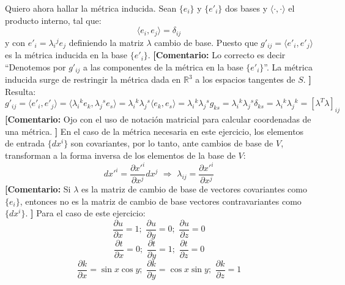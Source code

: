 \documentclass[11pt,spanish]{article}
\newcommand{\comentario}[1]{{\color{red} {\bf [Comentario:} #1 {\bf ]}}}
\newcommand{\idot}[2]{\langle #1 , #2 \rangle}
\begin{document}
Quiero ahora hallar la m\'etrica inducida.
Sean $\{e_i\}$ y $\{e'_i\}$ dos bases y $\idot{\cdot}{\cdot}$ el producto interno, tal que:
$$
\idot{e_i}{e_j} = \delta_{ij}
$$
y con $e'_i = \lambda_i{}^j e_j$ definiendo la matriz $\lambda$ cambio de base.
Puesto que $g'_{ij} = \idot{e'_i}{e'_j}$ es la m\'etrica inducida en la base $\{e'_i\}$. 
\comentario{Lo correcto es decir ``Denotemos por $g'_{ij}$ a las componentes de la m\'etrica en la base $\{e'_i\}$''. La m\'etrica inducida surge de restringir la m\'etrica dada en $\mathbb{R}^3$ a los espacios tangentes de $S$.}
Resulta:
$$
g'_{ij}
=
\idot{e'_i}{e'_j}
=
\idot{\lambda_i{}^k e_k}{\lambda_j{}^s e_s}
=
\lambda_i{}^k \lambda_j{}^s
\idot{e_k}{e_s}
=
\lambda_i{}^k \lambda_j{}^s
g_{ks}
=
\lambda_i{}^k \lambda_j{}^s
\delta_{ks}
=
\lambda_i{}^k \lambda_j{}^k
=
[\lambda^T \lambda]_{ij}
$$
\comentario{Ojo con el uso de notaci\'on matricial para calcular coordenadas de una m\'etrica.}
En el caso de la m\'etrica necesaria en este ejercicio, los elementos de entrada $\{dx^i\}$ son covariantes, por lo tanto, ante cambios de base de $V$, transforman a la forma inversa de los elementos de la base de $V$:
$$
dx'^i
=
\frac{\partial x'^i}{\partial x^j} dx^j
\,\,
\Rightarrow
\,\,
\lambda_{ij}
=
\frac{\partial x'^i}{\partial x^j}
$$
\comentario{Si $\lambda$ es la matriz de cambio de base de vectores covariantes como $\{e_i\}$, entonces  no es la matriz de cambio de base vectores contravariantes como $\{dx^i\}$.}
Para el caso de este ejercicio:
$$
\frac{\partial u}{\partial x}=1;\,\,
\frac{\partial u}{\partial y}=0;\,\,
\frac{\partial u}{\partial z}=0
$$
$$
\frac{\partial t}{\partial x}=0;\,\,
\frac{\partial t}{\partial y}=1;\,\,
\frac{\partial t}{\partial z}=0
$$
$$
\frac{\partial k}{\partial x}=\sin x\cos y;\,\,
\frac{\partial k}{\partial y}=\cos x\sin y;\,\,
\frac{\partial k}{\partial z}=1
$$
\end{document}
